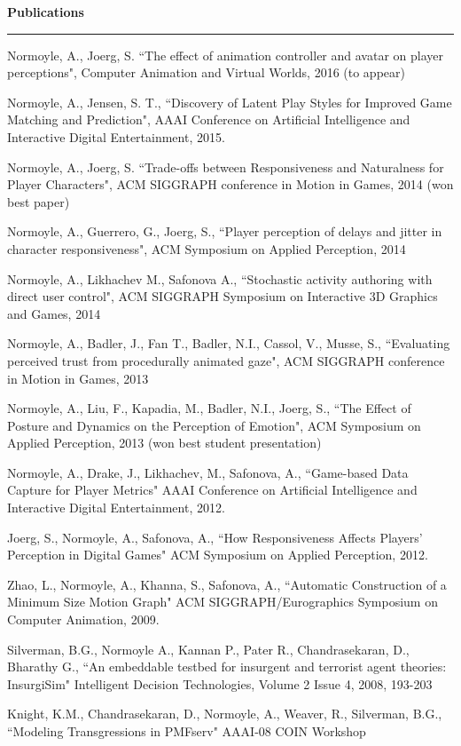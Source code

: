 {\Large {\bf  Publications}}
\vspace{0.1cm}
\hrule
\medskip

Normoyle, A., Joerg, S. ``The effect of animation controller and avatar on player perceptions", 
Computer Animation and Virtual Worlds, 2016 (to appear)

Normoyle, A., Jensen, S. T., ``Discovery of Latent Play Styles for Improved Game Matching and Prediction", 
AAAI Conference on Artificial Intelligence and Interactive Digital Entertainment, 2015.

Normoyle, A., Joerg, S. ``Trade-offs between Responsiveness and Naturalness for Player Characters", 
ACM SIGGRAPH conference in Motion in Games, 2014 (won best paper)

Normoyle, A., Guerrero, G., Joerg, S., ``Player perception of delays and jitter in character responsiveness", 
ACM Symposium on Applied Perception, 2014 

Normoyle, A., Likhachev M., Safonova A., ``Stochastic activity authoring with direct user control", 
ACM SIGGRAPH Symposium on Interactive 3D Graphics and Games, 2014 

Normoyle, A., Badler, J., Fan T., Badler, N.I., Cassol, V., Musse, S., ``Evaluating perceived trust from procedurally animated gaze", ACM SIGGRAPH conference in Motion in Games, 2013 

Normoyle, A., Liu, F., Kapadia, M., Badler, N.I., Joerg, S., ``The Effect of Posture and Dynamics on the Perception of Emotion", ACM Symposium on Applied Perception, 2013 (won best student presentation)

Normoyle, A., Drake, J., Likhachev, M., Safonova, A., ``Game-based Data Capture for Player Metrics" 
AAAI Conference on Artificial Intelligence and Interactive Digital Entertainment, 2012.

Joerg, S., Normoyle, A., Safonova, A., ``How Responsiveness Affects Players' Perception in Digital Games" 
ACM Symposium on Applied Perception, 2012.

Zhao, L., Normoyle, A., Khanna, S., Safonova, A., ``Automatic Construction of a Minimum Size Motion Graph" ACM SIGGRAPH/Eurographics Symposium on Computer Animation, 2009.

Silverman, B.G., Normoyle A., Kannan P., Pater R., Chandrasekaran, D., Bharathy G., ``An embeddable testbed for insurgent and terrorist agent theories: InsurgiSim" Intelligent Decision Technologies, Volume 2 Issue 4, 2008, 193-203

Knight, K.M., Chandrasekaran, D., Normoyle, A., Weaver, R., Silverman, B.G., ``Modeling Transgressions in PMFserv" AAAI-08 COIN Workshop

